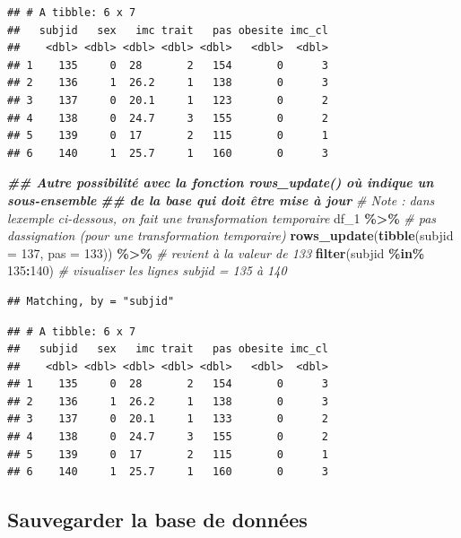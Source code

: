 \documentclass[
]{book}
\newenvironment{Shaded}{\begin{snugshade}}{\end{snugshade}}
\newcommand{\AttributeTok}[1]{\textcolor[rgb]{0.13,0.29,0.53}{#1}}
\newcommand{\CommentTok}[1]{\textcolor[rgb]{0.56,0.35,0.01}{\textit{#1}}}
\newcommand{\DecValTok}[1]{\textcolor[rgb]{0.00,0.00,0.81}{#1}}
\newcommand{\DocumentationTok}[1]{\textcolor[rgb]{0.56,0.35,0.01}{\textbf{\textit{#1}}}}
\newcommand{\FunctionTok}[1]{\textcolor[rgb]{0.13,0.29,0.53}{\textbf{#1}}}
\newcommand{\NormalTok}[1]{#1}
\newcommand{\SpecialCharTok}[1]{\textcolor[rgb]{0.81,0.36,0.00}{\textbf{#1}}}
\begin{document}
\begin{verbatim}
## # A tibble: 6 x 7
##   subjid   sex   imc trait   pas obesite imc_cl
##    <dbl> <dbl> <dbl> <dbl> <dbl>   <dbl>  <dbl>
## 1    135     0  28       2   154       0      3
## 2    136     1  26.2     1   138       0      3
## 3    137     0  20.1     1   123       0      2
## 4    138     0  24.7     3   155       0      2
## 5    139     0  17       2   115       0      1
## 6    140     1  25.7     1   160       0      3
\end{verbatim}

\begin{Shaded}
\begin{Highlighting}[]
\DocumentationTok{\#\# Autre possibilité avec la fonction rows\_update() où indique un sous{-}ensemble }
\DocumentationTok{\#\# de la base qui doit être mise à jour}
\CommentTok{\# Note : dans l\textquotesingle{}exemple ci{-}dessous, on fait une transformation temporaire}
\NormalTok{df\_1 }\SpecialCharTok{\%\textgreater{}\%} \CommentTok{\# pas d\textquotesingle{}assignation (pour une transformation temporaire)}
  \FunctionTok{rows\_update}\NormalTok{(}\FunctionTok{tibble}\NormalTok{(}\AttributeTok{subjid =} \DecValTok{137}\NormalTok{, }\AttributeTok{pas =} \DecValTok{133}\NormalTok{)) }\SpecialCharTok{\%\textgreater{}\%} \CommentTok{\# revient à la valeur de 133}
  \FunctionTok{filter}\NormalTok{(subjid }\SpecialCharTok{\%in\%} \DecValTok{135}\SpecialCharTok{:}\DecValTok{140}\NormalTok{) }\CommentTok{\# visualiser les lignes subjid = 135 à 140}
\end{Highlighting}
\end{Shaded}

\begin{verbatim}
## Matching, by = "subjid"
\end{verbatim}

\begin{verbatim}
## # A tibble: 6 x 7
##   subjid   sex   imc trait   pas obesite imc_cl
##    <dbl> <dbl> <dbl> <dbl> <dbl>   <dbl>  <dbl>
## 1    135     0  28       2   154       0      3
## 2    136     1  26.2     1   138       0      3
## 3    137     0  20.1     1   133       0      2
## 4    138     0  24.7     3   155       0      2
## 5    139     0  17       2   115       0      1
## 6    140     1  25.7     1   160       0      3
\end{verbatim}

\subsection{Sauvegarder la base de données}\label{sauvegarder-la-base-de-donnuxe9es-1}
\end{document}
